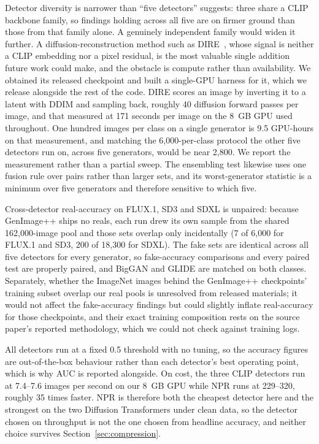 \documentclass[3p,times,procedia]{elsarticle}
\begin{document}
Detector diversity is narrower than ``five detectors'' suggests: three
share a CLIP backbone family, so findings holding across all five are on
firmer ground than those from that family alone. A genuinely independent
family would widen it further. A diffusion-reconstruction method such as
DIRE~\cite{wang2023dire}, whose signal is neither a CLIP embedding nor a
pixel residual, is the most valuable single addition future work could
make, and the obstacle is compute rather than availability. We obtained
its released checkpoint and built a single-GPU harness for it, which we
release alongside the rest of the code. DIRE scores an image by inverting
it to a latent with DDIM and sampling back, roughly 40 diffusion forward
passes per image, and that measured at 171 seconds per image on the 8~GB
GPU used throughout. One hundred images per class on a single generator
is 9.5 GPU-hours on that measurement, and matching the 6{,}000-per-class
protocol the other five detectors run on, across five generators, would be
near 2{,}800. We report the measurement rather than a partial sweep. The ensembling test likewise uses one fusion
rule over pairs rather than larger sets, and its worst-generator statistic
is a minimum over five generators and therefore sensitive to which five.

Cross-detector real-accuracy on FLUX.1, SD3 and SDXL is unpaired: because
GenImage++ ships no reals, each run drew its own sample from the shared
162{,}000-image pool and those sets overlap only incidentally (7 of
6{,}000 for FLUX.1 and SD3, 200 of 18{,}300 for SDXL). The fake sets are
identical across all five detectors for every generator, so fake-accuracy
comparisons and every paired test are properly paired, and BigGAN and
GLIDE are matched on both classes. Separately, whether the ImageNet images
behind the GenImage++ checkpoints' training subset overlap our real pools
is unresolved from released materials; it would not affect the
fake-accuracy findings but could slightly inflate real-accuracy for those
checkpoints, and their exact training composition rests on the source
paper's reported methodology, which we could not check against training
logs.

All detectors run at a fixed 0.5 threshold with no tuning, so the accuracy
figures are out-of-the-box behaviour rather than each detector's best
operating point, which is why AUC is reported alongside. On cost, the
three CLIP detectors run at 7.4--7.6 images per second on our 8~GB GPU
while NPR runs at 229--320, roughly 35 times faster. NPR is therefore both
the cheapest detector here and the strongest on the two Diffusion
Transformers under clean data, so the detector chosen on throughput is not
the one chosen from headline accuracy, and neither choice survives
Section~\ref{sec:compression}.
\end{document}
